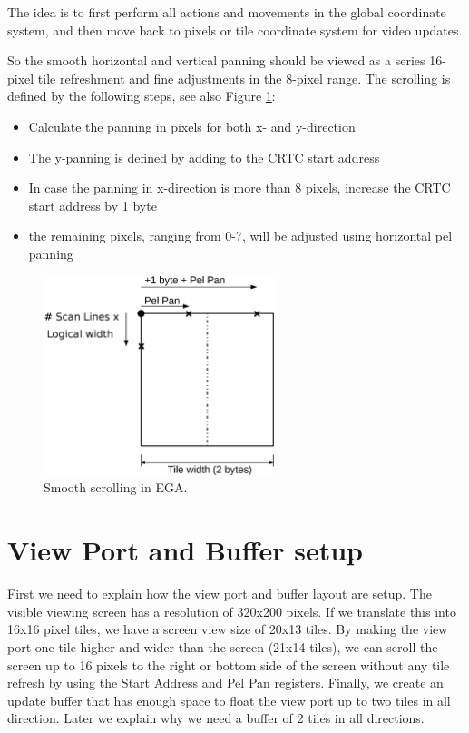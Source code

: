 \documentclass[book.tex]{subfiles}
\begin{document}
The idea is to first perform all actions and movements in the global coordinate system, and then move back to pixels or tile coordinate system for video updates. \\
\begin{minipage}{\textwidth}
  
  \end{minipage}
  \label{ega_refresh}
  \par


So the smooth horizontal and vertical panning should be viewed as a series 16-pixel tile refreshment and fine adjustments in the 8-pixel range. The scrolling is defined by the following steps, see also Figure \ref{fig:tile_refresh}:
\begin{itemize}
  \item Calculate the panning in pixels for both x- and y-direction
  \item The y-panning is defined by adding  to the CRTC start address
  \item In case the panning in x-direction is more than 8 pixels, increase the CRTC start address by 1 byte
  \item the remaining pixels, ranging from 0-7, will be adjusted using horizontal pel panning
\end{itemize}


\begin{figure}[H]
\centering
\includegraphics[width=0.6\textwidth]{imgs/drawings/Tile_Refresh.eps}
\caption{Smooth scrolling in EGA.}
\label{fig:tile_refresh}
\end{figure}





\section{View Port and Buffer setup}
First we need to explain how the view port and buffer layout are setup. The visible viewing screen has a resolution of 320x200 pixels. If we translate this into 16x16 pixel tiles, we have a screen view size of 20x13 tiles. By making the view port one tile higher and wider than the screen (21x14 tiles), we can scroll the screen up to 16 pixels to the right or bottom side of the screen without any tile refresh by using the Start Address and Pel Pan registers. Finally, we create an update buffer that has enough space to float the view port up to two tiles in all direction. Later we explain why we need a buffer of 2 tiles in all directions.\\
\end{document}
